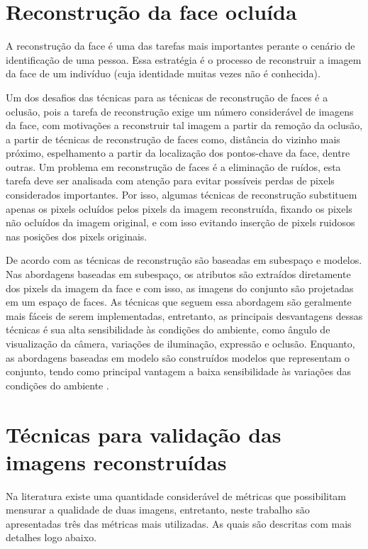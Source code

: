\section{Reconstrução da face ocluída}
\label{sec: reconst. face}
A reconstrução da face é uma das tarefas mais importantes perante o cenário de identificação de uma pessoa. Essa estratégia é o processo de reconstruir a imagem da face de um indivíduo (cuja identidade muitas vezes não é conhecida).


Um dos desafios das técnicas para as técnicas de reconstrução de faces é a oclusão, pois a tarefa de reconstrução exige um número considerável de imagens da face, com motivações a reconstruir tal imagem a partir da remoção da oclusão, a partir de técnicas de reconstrução de faces como, distância do vizinho mais próximo, espelhamento a partir da localização dos pontos-chave da face, dentre outras.
Um problema em reconstrução de faces é a eliminação de ruídos, esta tarefa deve ser analisada com atenção para evitar possíveis perdas de pixels considerados importantes. Por isso, algumas técnicas de reconstrução substituem apenas os pixels ocluídos pelos pixels da imagem reconstruída, fixando os pixels não ocluídos da imagem original, e com isso evitando inserção de pixels ruidosos nas posições dos pixels originais.


De acordo com    as técnicas de reconstrução são baseadas em subespaço e modelos. Nas abordagens baseadas em subespaço, os atributos são extraídos diretamente dos pixels da imagem da face e com isso, as imagens do conjunto são projetadas em um espaço de faces. As técnicas que seguem essa abordagem são geralmente mais fáceis de serem implementadas, entretanto, as principais desvantagens dessas técnicas é sua alta sensibilidade às condições do ambiente, como ângulo de visualização da câmera, variações de iluminação, expressão e oclusão. Enquanto, as abordagens baseadas em modelo são construídos modelos que representam o conjunto, tendo como principal vantagem a baixa sensibilidade às variações das condições do ambiente \cite{buciu2014challenges}. 



\section{Técnicas para validação das imagens reconstruídas}

Na literatura existe uma quantidade considerável de métricas que possibilitam mensurar a qualidade de duas imagens, entretanto, neste trabalho são apresentadas  três das métricas mais utilizadas. As quais são descritas com mais detalhes logo abaixo.

